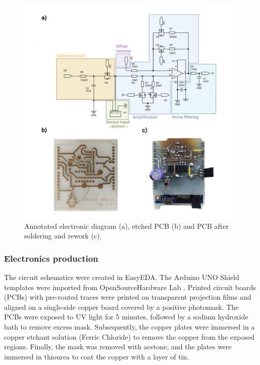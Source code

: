 \documentclass[conference]{IEEEtran}
\begin{document}
         \begin{figure}[!th]
            \centering
            \includegraphics[width=\textwidth]{images/electronic_diagram.png}
            \caption{Annotated electronic diagram (a), etched PCB (b) and PCB after soldering and rework (c).}
            \label{fig:circuit}
         \end{figure}


      \subsubsection{Electronics production}
      The circuit schematics were created in EasyEDA. The Arduino UNO Shield templates were imported from OpenSourceHardware Lab \cite{ArduinoShieldEasyEDA}.
      Printed circuit boards (PCBs) with pre-routed traces were printed on transparent projection films and aligned on a single-side copper board covered by a positive photomask.
      The PCBs were exposed to UV light for 5 minutes, followed by a sodium hydroxide bath to remove excess mask. Subsequently, the copper plates were immersed in a copper etchant solution (Ferric Chloride)
      to remove the copper from the exposed regions. Finally, the mask was removed with acetone, and the plates were immersed in thiourea to coat the copper with a layer of tin.
\end{document}
